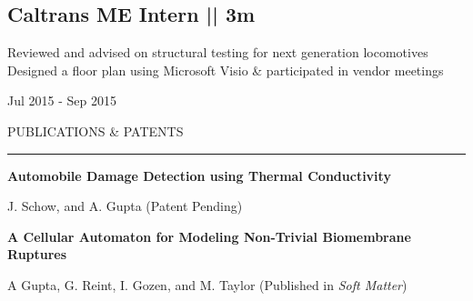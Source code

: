 \documentclass[letterpaper,10pt,oneside]{article}
\begin{document}
\begin{body}

\section
{\textbf{Caltrans}
\newline
ME Intern || 3m
\newline
}

\BulletItem
\vspace{-2.5ex}
\begin{detail}
\BulletItem
Reviewed and advised on structural testing for next generation locomotives
\BulletItem
Designed a floor plan using Microsoft Visio \& participated in vendor meetings
\end{detail}

\begin{subtitle}
\vspace{-7.8ex}
{{Jul 2015 - Sep 2015}}
\end{subtitle}
\vspace{3ex}

{
\hspace{-1.72in}\noindent\color{cblue}
{PUBLICATIONS \& PATENTS} %
}

\vspace{-1.6ex}
{\hspace{-1.73in}\noindent\color{dblue}\rule{6.935in}{0.4pt}} %
\vspace{-2ex}

{\hspace{-1.76in}\fontsize{9}{1}
\textbf{Automobile Damage Detection using Thermal Conductivity}}

{\hspace{-1.76in}\fontsize{9}{1}
{J. Schow, and A. Gupta (Patent Pending)}
}

\vspace{1ex}

{\hspace{-1.76in}\fontsize{9}{1}
\textbf{A Cellular Automaton for Modeling Non-Trivial Biomembrane Ruptures}
}

{\hspace{-1.76in}\fontsize{9}{1} 
{A Gupta, G. Reint, I. Gozen, and M. Taylor (Published in \textit{Soft Matter})}}
\vspace{3ex}



\end{body}
\end{document}
